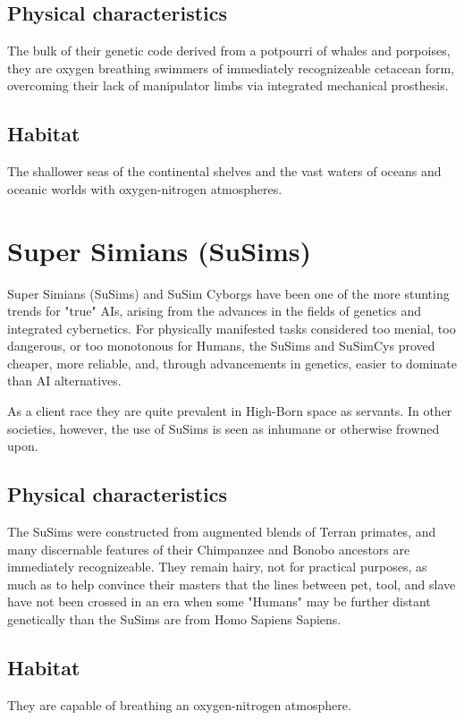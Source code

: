 \subsection{Physical characteristics}
The bulk of their genetic code derived from a potpourri of whales and
porpoises, they are oxygen breathing swimmers of immediately
recognizeable cetacean form, overcoming their lack of manipulator
limbs via integrated mechanical prosthesis.

\subsection{Habitat}
The shallower seas of the continental shelves and the vast waters of
oceans and oceanic worlds with oxygen-nitrogen atmospheres.

\section{Super Simians (SuSims)}

Super Simians (SuSims) and SuSim Cyborgs have been one of the more
stunting trends for "true" AIs, arising from the advances in the
fields of genetics and integrated cybernetics. For physically
manifested tasks considered too menial, too dangerous, or too
monotonous for Humans, the SuSims and SuSimCys proved cheaper, more
reliable, and, through advancements in genetics, easier to dominate
than AI alternatives.

As a client race they are quite prevalent in High-Born space as
servants. In other societies, however, the use of SuSims is seen as
inhumane or otherwise frowned upon.

\subsection{Physical characteristics}

The SuSims were constructed from augmented blends of Terran primates,
and many discernable features of their Chimpanzee and Bonobo ancestors
are immediately recognizeable. They remain hairy, not for practical
purposes, as much as to help convince their masters that the lines
between pet, tool, and slave have not been crossed in an era when some
"Humans" may be further distant genetically than the SuSims are from
Homo Sapiens Sapiens.

\subsection{Habitat}
They are capable of breathing an oxygen-nitrogen atmosphere. 

